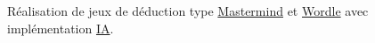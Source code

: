 Réalisation de jeux de déduction type \mbox{\hyperlink{class_mastermind}{Mastermind}} et \mbox{\hyperlink{class_wordle}{Wordle}} avec implémentation \mbox{\hyperlink{class_i_a}{IA}}. 